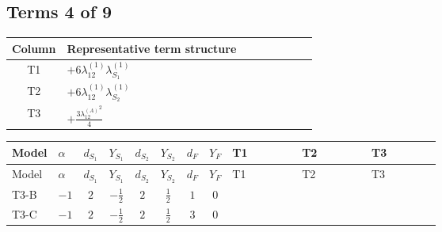\documentclass[8pt]{article}
\begin{document}
\begin{landscape}
\subsection*{Terms 4 of 9}
\begin{center}
\begin{tabular}{@{}c >{\raggedright\arraybackslash}p{0.82\linewidth}@{}}
\toprule
Column & Representative term structure \\
\midrule
T1 & \(\displaystyle +6 {\lambda_{12}^{(1)}} {\lambda_{S_1}^{(1)}}\) \\
\midrule
T2 & \(\displaystyle +6 {\lambda_{12}^{(1)}} {\lambda_{S_2}^{(1)}}\) \\
\midrule
T3 & \(\displaystyle +\frac{3 {\lambda_{12}^{(A)}}^2}{4}\) \\
\midrule
\bottomrule
\end{tabular}
\end{center}
\smallskip
\tiny
\begin{longtable}{@{}llcccccc >{\raggedright\arraybackslash}p{0.21\linewidth} >{\raggedright\arraybackslash}p{0.21\linewidth} >{\raggedright\arraybackslash}p{0.21\linewidth}@{}}
\toprule
Model & $\alpha$ & $d_{S_1}$ & $Y_{S_1}$ & $d_{S_2}$ & $Y_{S_2}$ & $d_F$ & $Y_F$ & T1 & T2 & T3 \\
\midrule
\endfirsthead
\toprule
Model & $\alpha$ & $d_{S_1}$ & $Y_{S_1}$ & $d_{S_2}$ & $Y_{S_2}$ & $d_F$ & $Y_F$ & T1 & T2 & T3 \\
\midrule
\endhead
T3-B & $-1$ & $2$ & $-\frac{1}{2}$ & $2$ & $\frac{1}{2}$ & $1$ & $0$ & \scriptsize\adjustbox{max width=\linewidth}{$\begin{gathered} +6 {\lambda_{12}^{(1)}} {\lambda_{S_1}^{(1)}}\end{gathered}$} & \scriptsize\adjustbox{max width=\linewidth}{$\begin{gathered} +6 {\lambda_{12}^{(1)}} {\lambda_{S_2}^{(1)}}\end{gathered}$} & \scriptsize\adjustbox{max width=\linewidth}{$\begin{gathered} +\frac{3 {\lambda_{12}^{(A)}}^2}{4}\end{gathered}$} \\
\midrule
T3-C & $-1$ & $2$ & $-\frac{1}{2}$ & $2$ & $\frac{1}{2}$ & $3$ & $0$ & \scriptsize\adjustbox{max width=\linewidth}{$\begin{gathered} +6 {\lambda_{12}^{(1)}} {\lambda_{S_1}^{(1)}}\end{gathered}$} & \scriptsize\adjustbox{max width=\linewidth}{$\begin{gathered} +6 {\lambda_{12}^{(1)}} {\lambda_{S_2}^{(1)}}\end{gathered}$} & \scriptsize\adjustbox{max width=\linewidth}{$\begin{gathered} +\frac{3 {\lambda_{12}^{(A)}}^2}{4}\end{gathered}$} \\

\end{longtable}
\end{landscape}
\end{document}
